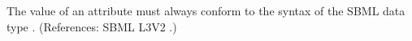 The value of an  attribute must always conform to the syntax of
the SBML data type .  (References: SBML L3V2
.)
